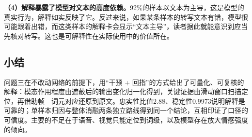 \textbf{（4）解释暴露了模型对文本的高度依赖。}92\%的样本以文本为主导，这是模型的真实行为，解释如实反映了它。反过来说，如果某条样本的转写文本有错，模型很可能跟着出错，而这类样本的解释卡会显示“文本主导”，读者据此就能意识到应当先核对转写。这也是可解释性在实际使用中的价值所在。

\subsection{小结}

问题三在不改动网络的前提下，用“干预 + 回指”的方式给出了可量化、可复核的解释：模态作用程度由遮蔽后的输出变化归一化得到，关键证据由滑动窗口扫描定位，再借助帧—词元对应还原到原文。忠实性比值2.88、稳定性0.9973说明解释是可靠的；单样本归因与整体消融两条独立路线得到同一个结论，互相印证了口径的可信度。主要的不足在于语音、视觉只能定位到词级，以及模型存在放大情感强度的倾向。
